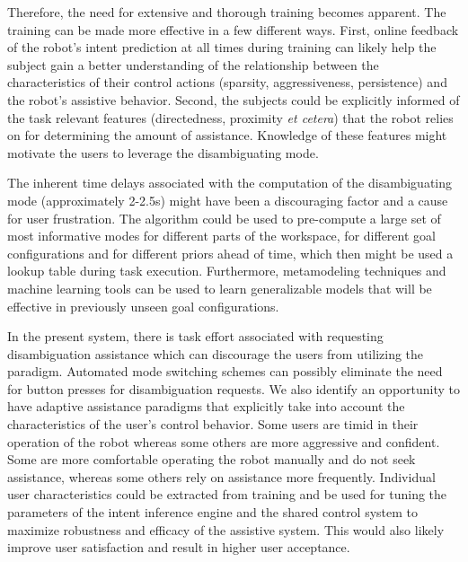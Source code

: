 \documentclass[natbib, twocolumn]{svjour3}          %
\begin{document}
 Therefore, the need for extensive and thorough training becomes apparent.
 The training can be made more effective in a few different ways. First, online feedback of the robot's intent prediction at all times during training can likely help the subject gain a better understanding of the relationship between the characteristics of their control actions (sparsity, aggressiveness, persistence) and the robot's assistive behavior. Second, the subjects could be explicitly informed of the task relevant features (directedness, proximity \textit{et cetera}) that the robot relies on for determining the amount of assistance. Knowledge of these features might motivate the users to leverage the disambiguating mode. 
 
 The inherent time delays associated with the computation of the disambiguating mode (approximately 2-2.5s) might have been a discouraging factor and a cause for user frustration. The algorithm could be used to pre-compute a large set of most informative modes for different parts of the workspace, for different goal configurations and for different priors ahead of time, which then might be used a lookup table during task execution. Furthermore, metamodeling techniques and machine learning tools can be used to learn generalizable models that will be effective in previously unseen goal configurations. 
 
 In the present system, there is task effort associated with requesting disambiguation assistance which can discourage the users from utilizing the paradigm. Automated mode switching schemes can possibly eliminate the need for button presses for disambiguation requests. 
 We also identify an opportunity to have adaptive assistance
 paradigms that explicitly take into account the characteristics of the user's control behavior. Some users are timid in their operation of the robot whereas some others are more aggressive and confident. Some are more comfortable operating the robot manually and do not seek assistance, whereas some others rely on assistance more frequently. Individual user characteristics could be extracted from training and be used for tuning the parameters of the intent inference engine and the shared control system to maximize robustness and efficacy of the assistive system. This would also likely improve user satisfaction and result in higher user acceptance.
  
\end{document}
